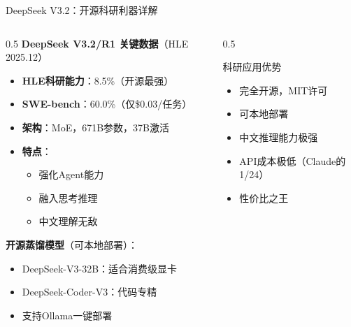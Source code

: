 \documentclass[aspectratio=169,11pt]{beamer}
\begin{document}
\begin{frame}{DeepSeek V3.2：开源科研利器详解}
    \begin{columns}
        \begin{column}{0.5\textwidth}
            \textbf{DeepSeek V3.2/R1 关键数据}（HLE 2025.12）
            \begin{itemize}
                \item \textbf{HLE科研能力}：8.5\%（开源最强）
                \item \textbf{SWE-bench}：60.0\%（仅\$0.03/任务）
                \item \textbf{架构}：MoE，671B参数，37B激活
                \item \textbf{特点}：
                    \begin{itemize}
                        \item 强化Agent能力
                        \item 融入思考推理
                        \item 中文理解无敌
                    \end{itemize}
            \end{itemize}
            
            \vspace{0.2cm}
            \textbf{开源蒸馏模型}（可本地部署）：
            \begin{itemize}
                \item DeepSeek-V3-32B：适合消费级显卡
                \item DeepSeek-Coder-V3：代码专精
                \item 支持Ollama一键部署
            
            \end{itemize}
        \end{column}
        \begin{column}{0.5\textwidth}
            \begin{alertblock}{科研应用优势}
                \begin{itemize}
                    \item \textcolor{green!60!black}{\checkmark} 完全开源，MIT许可
                    \item \textcolor{green!60!black}{\checkmark} 可本地部署
                    \item \textcolor{green!60!black}{\checkmark} 中文推理能力极强
                    \item \textcolor{green!60!black}{\checkmark} API成本极低（Claude的1/24）
                    \item \textcolor{green!60!black}{\checkmark} 性价比之王
                \end{itemize}
            \end{alertblock}
            

\end{column}
\end{columns}
\end{frame}
\end{document}
